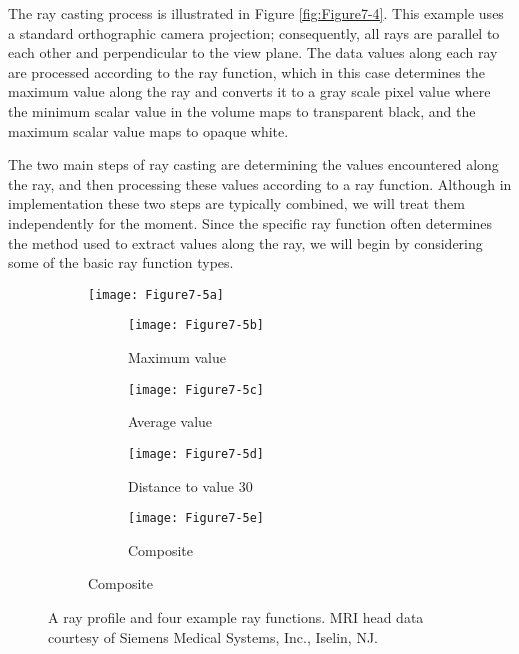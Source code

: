 The ray casting process is illustrated in Figure \ref{fig:Figure7-4}. This example uses a standard orthographic camera projection; consequently, all rays are parallel to each other and perpendicular to the view plane. The data values along each ray are processed according to the ray function, which in this case determines the maximum value along the ray and converts it to a gray scale pixel value where the minimum scalar value in the volume maps to transparent black, and the maximum scalar value maps to opaque white.

The two main steps of ray casting are determining the values encountered along the ray, and then processing these values according to a ray function. Although in implementation these two steps are typically combined, we will treat them independently for the moment. Since the specific ray function often determines the method used to extract values along the ray, we will begin by considering some of the basic ray function types.

\begin{figure}[!htb]
    \centering
	\begin{subfigure}[h]{0.68\linewidth}
		\texttt{[image: Figure7-5a]}
		\caption*{}\label{fig:Figure7-5a}
	\end{subfigure}
	\hfill
    \begin{subfigure}[h]{0.68\linewidth}
    	\begin{subfigure}[h]{0.48\linewidth}
    		\texttt{[image: Figure7-5b]}
    		\caption*{Maximum value}\label{fig:Figure7-5b}
    	\end{subfigure}%
    	\hfill
    	\begin{subfigure}[h]{0.48\linewidth}
    		\texttt{[image: Figure7-5c]}
    		\caption*{Average value}\label{fig:Figure7-5c}
    	\end{subfigure}
    	\hfill
    	\begin{subfigure}[h]{0.48\linewidth}
    		\texttt{[image: Figure7-5d]}
    		\caption*{Distance to value 30}\label{fig:Figure7-5d}
    	\end{subfigure}%
    	\hfill
    	\begin{subfigure}[h]{0.48\linewidth}
    		\texttt{[image: Figure7-5e]}
    		\caption*{Composite}\label{fig:Figure7-5e}
    	\end{subfigure}
    \end{subfigure}
	\caption{A ray profile and four example ray functions. MRI head data courtesy of Siemens Medical Systems, Inc., Iselin, NJ.}\label{fig:Figure7-5}
\end{figure}

